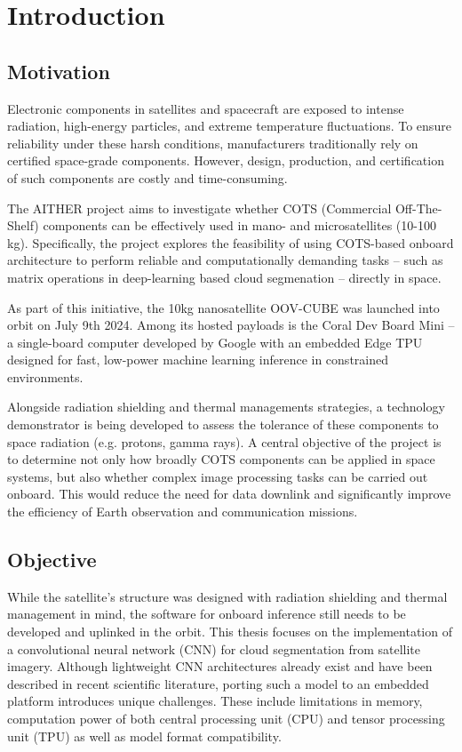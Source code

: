 {

\setlength{\parindent}{0pt}
\setlength{\parskip}{1em}

\section{Introduction}
\subsection{Motivation}

Electronic components in satellites and spacecraft are exposed to intense radiation, high-energy particles, and extreme temperature fluctuations. To ensure reliability under these harsh conditions, manufacturers traditionally rely on certified space-grade components. However, design, production, and certification of such components are costly and time\--con\-su\-ming. 

The AITHER project aims to investigate whether COTS (Commercial Off-The-Shelf) components can be effectively used in mano- and microsatellites (10-100 kg). Specifically, the project explores the feasibility of using COTS-based onboard architecture to perform reliable and computationally demanding tasks -- such as matrix operations in deep-learning based cloud segmenation -- directly in space. 

As part of this initiative, the 10kg nanosatellite OOV-CUBE was launched into orbit on July 9th 2024. Among its hosted payloads is the Coral Dev Board Mini – a single-board computer developed by Google with an embedded Edge TPU designed for fast, low-power machine learning inference in constrained environments.

Alongside radiation shielding and thermal managements strategies, a technology demonstrator is being developed to assess the tolerance of these components to space radiation (e.g. protons, gamma rays). A central objective of the project is to determine not only how broadly COTS components can be applied in space systems, but also whether complex image processing tasks can be carried out onboard. This would reduce the need for data downlink and significantly improve the efficiency of Earth observation and communication missions.

\subsection{Objective}

While the satellite's structure was designed with radiation shielding and thermal management in mind, the software for onboard inference still needs to be developed and uplinked in the orbit. This thesis focuses on the implementation of a convolutional neural network (CNN) for cloud segmentation from satellite imagery. Although lightweight CNN architectures already exist and have been described in recent scientific literature, porting such a model to an embedded platform introduces unique challenges. These include limitations in memory, computation power of both central processing unit (CPU) and tensor processing unit (TPU) as well as model format compatibility.

}

